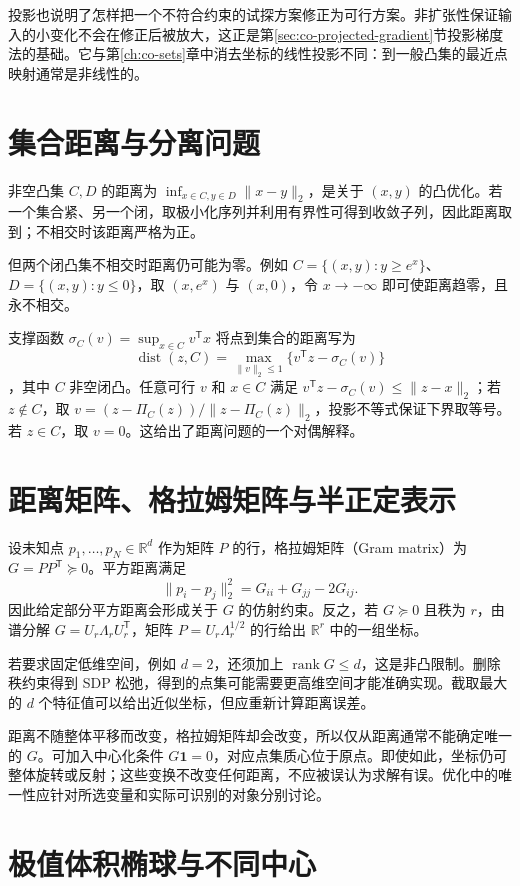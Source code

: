 \documentclass[UTF8,12pt,a4paper,fontset=fandol]{ctexbook}
\begin{document}
投影也说明了怎样把一个不符合约束的试探方案修正为可行方案。非扩张性保证输入的小变化不会在修正后被放大，这正是第\ref{sec:co-projected-gradient}节投影梯度法的基础。它与第\ref{ch:co-sets}章中消去坐标的线性投影不同：到一般凸集的最近点映射通常是非线性的。

\section{集合距离与分离问题}

非空凸集 $C,D$ 的距离为 $\inf_{x\in C,y\in D}\|x-y\|_2$，是关于 $(x,y)$ 的凸优化。若一个集合紧、另一个闭，取极小化序列并利用有界性可得到收敛子列，因此距离取到；不相交时该距离严格为正。

但两个闭凸集不相交时距离仍可能为零。例如 $C=\{(x,y):y\geq e^x\}$、$D=\{(x,y):y\leq0\}$，取 $(x,e^x)$ 与 $(x,0)$，令 $x\to-\infty$ 即可使距离趋零，且永不相交。

支撑函数 $\sigma_C(v)=\sup_{x\in C}v^{\mathsf T}x$ 将点到集合的距离写为
\[
 \operatorname{dist}(z,C)=\max_{\|v\|_2\leq1}\{v^{\mathsf T}z-\sigma_C(v)\}
\]
，其中 $C$ 非空闭凸。任意可行 $v$ 和 $x\in C$ 满足 $v^{\mathsf T}z-\sigma_C(v)\leq\|z-x\|_2$；若 $z\notin C$，取 $v=(z-\Pi_C(z))/\|z-\Pi_C(z)\|_2$，投影不等式保证下界取等号。若 $z\in C$，取 $v=0$。这给出了距离问题的一个对偶解释。

\section{距离矩阵、格拉姆矩阵与半正定表示}

设未知点 $p_1,\ldots,p_N\in\mathbb R^d$ 作为矩阵 $P$ 的行，格拉姆矩阵（Gram matrix）为 $G=PP^{\mathsf T}\succeq0$。平方距离满足
\[
 \|p_i-p_j\|_2^2=G_{ii}+G_{jj}-2G_{ij}.
\]
因此给定部分平方距离会形成关于 $G$ 的仿射约束。反之，若 $G\succeq0$ 且秩为 $r$，由谱分解 $G=U_r\Lambda_rU_r^{\mathsf T}$，矩阵 $P=U_r\Lambda_r^{1/2}$ 的行给出 $\mathbb R^r$ 中的一组坐标。

若要求固定低维空间，例如 $d=2$，还须加上 $\operatorname{rank}G\leq d$，这是非凸限制。删除秩约束得到 SDP 松弛，得到的点集可能需要更高维空间才能准确实现。截取最大的 $d$ 个特征值可以给出近似坐标，但应重新计算距离误差。

距离不随整体平移而改变，格拉姆矩阵却会改变，所以仅从距离通常不能确定唯一的 $G$。可加入中心化条件 $G\mathbf1=0$，对应点集质心位于原点。即使如此，坐标仍可整体旋转或反射；这些变换不改变任何距离，不应被误认为求解有误。优化中的唯一性应针对所选变量和实际可识别的对象分别讨论。

\section{极值体积椭球与不同中心}
\end{document}
